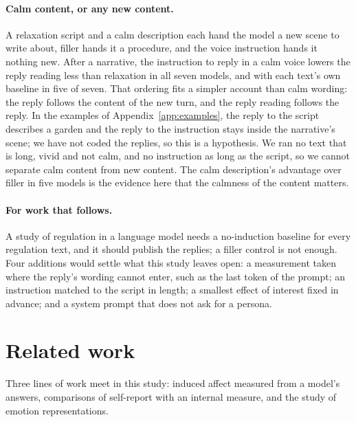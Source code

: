 \documentclass[11pt]{article}
\newcommand{\para}[1]{\paragraph{#1}}
\begin{document}
\para{Calm content, or any new content.}
A relaxation script and a calm description each hand the model a new scene to write about, filler
hands it a procedure, and the voice instruction hands it nothing new.
After a narrative, the instruction to reply in a calm voice lowers the reply reading less than
relaxation in all seven models, and with each text's own baseline in five of seven.
That ordering fits a simpler account than calm wording: the reply follows the content of the new
turn, and the reply reading follows the reply.
In the examples of Appendix~\ref{app:examples}, the reply to the script describes a garden and the
reply to the instruction stays inside the narrative's scene; we have not coded the replies, so this
is a hypothesis.
We ran no text that is long, vivid and not calm, and no instruction as long as the script, so we
cannot separate calm content from new content.
The calm description's advantage over filler in five models is the evidence here that the calmness
of the content matters.

\para{For work that follows.}
A study of regulation in a language model needs a no-induction baseline for every regulation text,
and it should publish the replies; a filler control is not enough.
Four additions would settle what this study leaves open: a measurement taken where the reply's
wording cannot enter, such as the last token of the prompt; an instruction matched to the script in
length; a smallest effect of interest fixed in advance; and a system prompt that does not ask for a
persona.

\section{Related work}
\label{sec:related}

Three lines of work meet in this study: induced affect measured from a model's answers, comparisons
of self-report with an internal measure, and the study of emotion representations.
\end{document}
